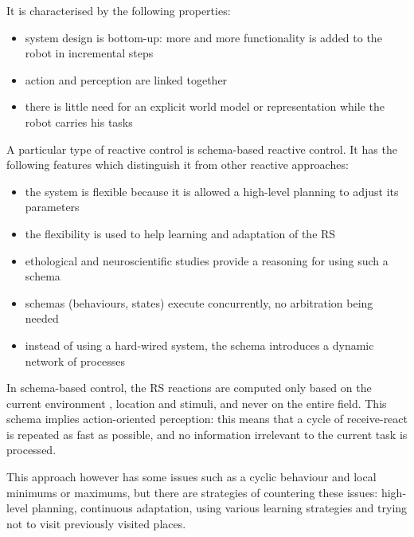 \documentclass[12pt]{report}
\begin{document}
It is characterised by the following properties:

\begin{itemize}

\item  system design is bottom-up: more and more functionality is added to the robot in incremental steps

\item action and perception are linked together

\item there is little need for an explicit world model or representation while the robot carries his tasks

\end{itemize}

A particular type of reactive control is schema-based reactive control. It has the following features which distinguish it from other reactive approaches:

\begin{itemize}

\item the system is flexible because it is allowed a high-level planning to adjust its parameters

\item the flexibility is used to help learning and adaptation of the RS

\item ethological and neuroscientific studies provide a reasoning for using such a schema

\item schemas (behaviours, states) execute concurrently, no arbitration being needed

\item instead of using a hard-wired system, the schema introduces a dynamic network of processes

\end{itemize}


In schema-based control, the RS reactions are computed only based on the current environment , location and stimuli, and never on the entire field.
This schema implies action-oriented perception: this means that a cycle of receive-react is repeated as fast as possible, and no information irrelevant to the current task is processed. 


This approach however has some issues such as a cyclic behaviour and local minimums or maximums, but there are strategies of countering these issues: high-level planning, continuous adaptation, using various learning strategies and trying not to visit previously visited places.
\end{document}
